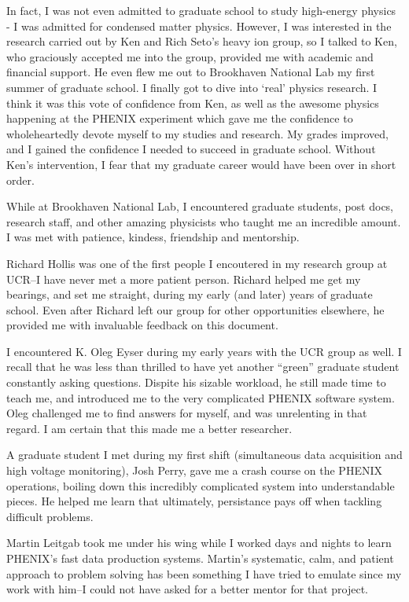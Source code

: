 In fact, I was not even admitted to graduate school to study high-energy physics
- I was admitted for condensed matter physics. However, I was interested in the
research carried out by Ken and Rich Seto's heavy ion group, so I talked to Ken,
who graciously accepted me into the group, provided me with academic and
financial support. He even flew me out to Brookhaven National Lab my first
summer of graduate school. I finally got to dive into `real' physics research.
I think it was this vote of confidence from Ken, as well as the awesome physics
happening at the PHENIX experiment which gave me the confidence to
wholeheartedly devote myself to my studies and research.  My grades improved,
and I gained the confidence I needed to succeed in graduate school.  Without
Ken's intervention, I fear that my graduate career would have been over in short
order.

While at Brookhaven National Lab, I encountered graduate students, post docs,
research staff, and other amazing physicists who taught me an incredible
amount. I was met with patience, kindess, friendship and mentorship.

Richard Hollis was one of the first people I encoutered in my research group at
UCR--I have never met a more patient person. Richard helped me get my bearings,
and set me straight, during my early (and later) years of graduate school. Even
after Richard left our group for other opportunities elsewhere, he provided me
with invaluable feedback on this document.  

I encountered K. Oleg Eyser during my early years with the UCR group as well. I
recall that he was less than thrilled to have yet another ``green'' graduate
student constantly asking questions. Dispite his sizable workload, he still made
time to teach me, and introduced me to the very complicated PHENIX software
system.  Oleg challenged me to find answers for myself, and was unrelenting in
that regard. I am certain that this made me a better researcher.

A graduate student I met during my first shift (simultaneous data acquisition
and high voltage monitoring), Josh Perry, gave me a crash course on the PHENIX
operations, boiling down this incredibly complicated system into understandable
pieces. He helped me learn that ultimately, persistance pays off when tackling
difficult problems.  

Martin Leitgab took me under his wing while I worked days and nights to learn
PHENIX's fast data production systems.  Martin's systematic, calm, and patient
approach to problem solving has been something I have tried to emulate since my
work with him--I could not have asked for a better mentor for that project. 

